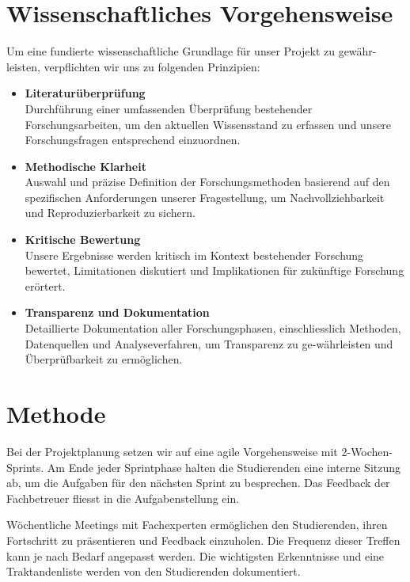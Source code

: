 \section{Wissenschaftliches Vorgehensweise}

Um eine fundierte wissenschaftliche Grundlage für unser Projekt zu gewähr-leisten, verpflichten wir uns zu folgenden Prinzipien:

\begin{itemize}
    \item \textbf{Literaturüberprüfung} \\
    Durchführung einer umfassenden Überprüfung bestehender Forschungsarbeiten, um den aktuellen Wissensstand zu erfassen und unsere Forschungsfragen entsprechend einzuordnen.
    
    \item \textbf{Methodische Klarheit} \\ 
    Auswahl und präzise Definition der Forschungsmethoden basierend auf den spezifischen Anforderungen unserer Fragestellung, um Nachvollziehbarkeit und Reproduzierbarkeit zu sichern.
    
    \item \textbf{Kritische Bewertung} \\
    Unsere Ergebnisse werden kritisch im Kontext bestehender Forschung bewertet, Limitationen diskutiert und Implikationen für zukünftige Forschung erörtert.
    
    \item \textbf{Transparenz und Dokumentation} \\
    Detaillierte Dokumentation aller Forschungsphasen, einschliesslich Methoden, Datenquellen und Analyseverfahren, um Transparenz zu ge-währleisten und Überprüfbarkeit zu ermöglichen.
    
\end{itemize}

\section{Methode} %
Bei der Projektplanung setzen wir auf eine agile Vorgehensweise mit 2-Wochen-Sprints. Am Ende jeder Sprintphase halten die Studierenden eine interne Sitzung ab, um die Aufgaben für den nächsten Sprint zu besprechen. Das Feedback der Fachbetreuer fliesst in die Aufgabenstellung ein.

Wöchentliche Meetings mit Fachexperten ermöglichen den Studierenden, ihren Fortschritt zu präsentieren und Feedback einzuholen. Die Frequenz dieser Treffen kann je nach Bedarf angepasst werden. Die wichtigsten Erkenntnisse und eine Traktandenliste werden von den Studierenden dokumentiert.

